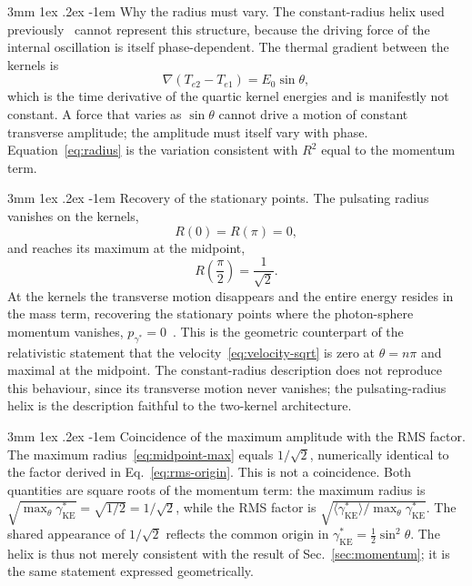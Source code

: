 \documentclass[%
 reprint, amsmath,amssymb, aps, prb, ]{revtex4-2}
\makeatletter
\numberwithin{equation}{section}
\renewcommand\paragraph{%
  \@startsection{paragraph}{4}{\z@}%
    {3mm \@plus 1ex \@minus .2ex}%
    {-1em}%
    {\normalfont\normalsize\itshape}}
\newcommand{\gKE}{\gamma^{*}_{\text{KE}}}
\makeatother
\begin{document}
\paragraph{Why the radius must vary.}
The constant-radius helix used previously~\cite{hanamura51} cannot represent this structure, because the driving force of the internal oscillation is itself phase-dependent. The thermal gradient between the kernels is~\cite{hanamura01}
\begin{equation}
\nabla(T_{e2}-T_{e1}) = E_0\sin\theta,
\label{eq:gradient}
\end{equation}
which is the time derivative of the quartic kernel energies and is manifestly not constant. A force that varies as $\sin\theta$ cannot drive a motion of constant transverse amplitude; the amplitude must itself vary with phase. Equation~\eqref{eq:radius} is the variation consistent with $R^2$ equal to the momentum term.

\paragraph{Recovery of the stationary points.}
The pulsating radius vanishes on the kernels,
\begin{equation}
R(0)=R(\pi)=0,
\label{eq:kernel-vanish}
\end{equation}
and reaches its maximum at the midpoint,
\begin{equation}
R\!\left(\frac{\pi}{2}\right)=\frac{1}{\sqrt{2}} .
\label{eq:midpoint-max}
\end{equation}
At the kernels the transverse motion disappears and the entire energy resides in the mass term, recovering the stationary points where the photon-sphere momentum vanishes, $p_{\gamma^{*}}=0$~\cite{hanamura07}. This is the geometric counterpart of the relativistic statement that the velocity~\eqref{eq:velocity-sqrt} is zero at $\theta=n\pi$ and maximal at the midpoint. The constant-radius description does not reproduce this behaviour, since its transverse motion never vanishes; the pulsating-radius helix is the description faithful to the two-kernel architecture.

\paragraph{Coincidence of the maximum amplitude with the RMS factor.}
The maximum radius~\eqref{eq:midpoint-max} equals $1/\sqrt{2}$, numerically identical to the factor derived in Eq.~\eqref{eq:rms-origin}. This is not a coincidence. Both quantities are square roots of the momentum term: the maximum radius is $\sqrt{\max_\theta\gKE}=\sqrt{1/2}=1/\sqrt{2}$, while the RMS factor is $\sqrt{\langle\gKE\rangle/\max_\theta\gKE}$. The shared appearance of $1/\sqrt{2}$ reflects the common origin in $\gKE=\tfrac{1}{2}\sin^2\theta$. The helix is thus not merely consistent with the result of Sec.~\ref{sec:momentum}; it is the same statement expressed geometrically.
\end{document}
